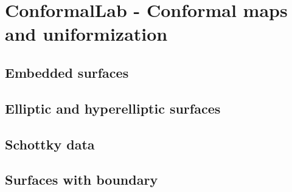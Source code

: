 
\chapter{{\sc ConformalLab} - Conformal maps and uniformization}
\label{sec:conformallab}
\section{Embedded surfaces}
\section{Elliptic and hyperelliptic surfaces}
\section{Schottky data}
\section{Surfaces with boundary}


